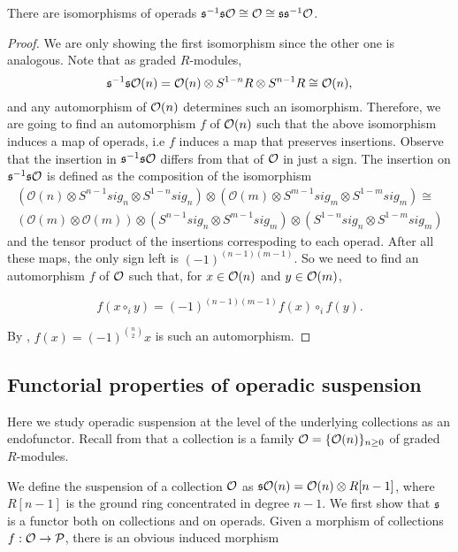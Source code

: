 \documentclass[Thesis.tex]{subfiles}
\begin{document}
\begin{lem}\label{suspiso}
There are isomorphisms of operads $\mathfrak{s}^{-1}\mathfrak{s}{\mathcal O}\cong{\mathcal O}\cong\mathfrak{s}\mathfrak{s}^{-1}{\mathcal O}$.
\end{lem}
\begin{proof}
We are only showing the first isomorphism since the other one is analogous. Note that as graded $R$-modules, \[\mathfrak{s}^{-1}\mathfrak{s}{\mathcal O}(n)= {\mathcal O}(n)\otimes S^{1-n}R\otimes S^{n-1}R\cong{\mathcal O}(n),\] 
and any automorphism of ${\mathcal O}(n)$ determines such an isomorphism. Therefore, we are going to find an automorphism $f$ of ${\mathcal O}(n)$ such that the above isomorphism induces a map of operads, i.e $f$ induces a map that preserves insertions. Observe that the insertion in $\mathfrak{s}^{-1}\mathfrak{s}{\mathcal O}$ differs from that of ${\mathcal O}$ in just a sign. The insertion on $\mathfrak{s}^{-1}\mathfrak{s}{\mathcal O}$ is defined as the composition of the isomorphism
\begin{align*}
(\mathcal{O}(n)\otimes S^{n-1}sig_n\otimes S^{1-n}sig_n)\otimes (\mathcal{O}(m)\otimes S^{m-1}sig_m\otimes S^{1-m}sig_m)\cong\\ (\mathcal{O}(m)\otimes \mathcal{O}(m))\otimes (S^{n-1}sig_n\otimes S^{m-1}sig_m)\otimes (S^{1-n}sig_n\otimes S^{1-m}sig_m)
\end{align*}
and the tensor product of the insertions correspoding to each operad. After all these maps, the only sign left is $(-1)^{(n-1)(m-1)}$. So we need to find an automorphism $f$ of ${\mathcal O}$ such that, for $x\in{\mathcal O}(n)$ and $y\in{\mathcal O}(m)$,

\[f(x\circ_i y)=(-1)^{(n-1)(m-1)}f(x)\circ_i f(y).\]

By , $f(x)=(-1)^{\binom{n}{2}}x$ is such an automorphism.
\end{proof}


\subsection{Functorial properties of operadic suspension}\label{functorial}


Here we study operadic suspension at the level of the underlying collections as an endofunctor. Recall from  that a collection is a family ${\mathcal O}=\{{\mathcal O}(n)\}_{n\geq 0}$ of graded $R$-modules.

We define the suspension of a collection ${\mathcal O}$ as $\mathfrak{s}{\mathcal O}(n)={\mathcal O}(n)\otimes R[n-1]$, where $R[n-1]$ is the ground ring concentrated in degree $n-1$. We first show that $\mathfrak{s}$ is a functor both on collections and on operads. %
Given a morphism of collections $f:{\mathcal O}\to\mathcal{P}$, there is an obvious induced morphism
\end{document}
